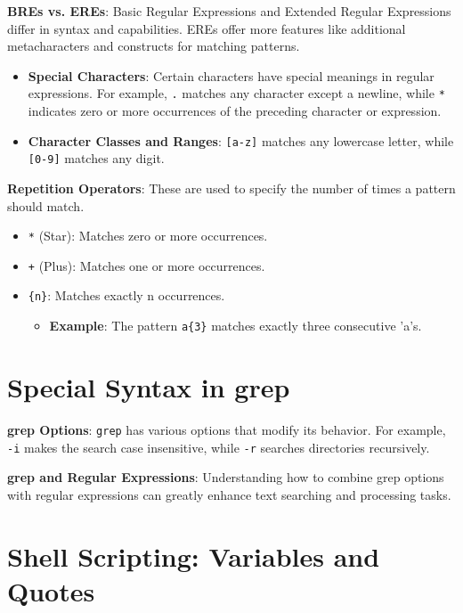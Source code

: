 \documentclass{article}
\begin{document}
\textbf{BREs vs. EREs}: Basic Regular Expressions and Extended Regular Expressions differ in syntax and capabilities. EREs offer more features like additional metacharacters and constructs for matching patterns.

\begin{itemize}
    \item \textbf{Special Characters}: Certain characters have special meanings in regular expressions. For example, \texttt{.} matches any character except a newline, while \texttt{*} indicates zero or more occurrences of the preceding character or expression.
    \item \textbf{Character Classes and Ranges}: \texttt{[a-z]} matches any lowercase letter, while \texttt{[0-9]} matches any digit.
\end{itemize}

\textbf{Repetition Operators}: These are used to specify the number of times a pattern should match.

\begin{itemize}
    \item \texttt{*} (Star): Matches zero or more occurrences.
    \item \texttt{+} (Plus): Matches one or more occurrences.
    \item \texttt{\{n\}}: Matches exactly n occurrences.
    \begin{itemize}
        \item \textbf{Example}: The pattern \texttt{a\{3\}} matches exactly three consecutive 'a's.
    \end{itemize}
\end{itemize}

\section{Special Syntax in grep}

\textbf{grep Options}: \texttt{grep} has various options that modify its behavior. For example, \texttt{-i} makes the search case insensitive, while \texttt{-r} searches directories recursively.

\textbf{grep and Regular Expressions}: Understanding how to combine grep options with regular expressions can greatly enhance text searching and processing tasks.

\section{Shell Scripting: Variables and Quotes}
\end{document}
